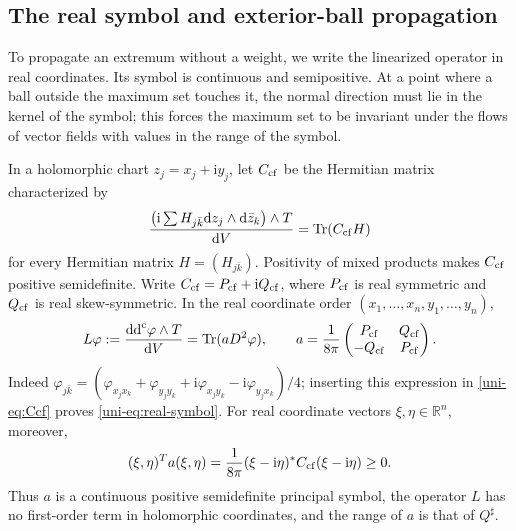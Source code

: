 \subsection{The real symbol and exterior-ball propagation}

To propagate an extremum without a weight, we write the linearized operator in real coordinates. Its symbol is continuous and semipositive. At a point where a ball outside the maximum set touches it, the normal direction must lie in the kernel of the symbol; this forces the maximum set to be invariant under the flows of vector fields with values in the range of the symbol.

In a holomorphic chart $z_j=x_j+\mathrm{i} y_j$, let $C_{\rm cf}$ be the
Hermitian matrix characterized by
\begin{equation}\label{uni-eq:Ccf}
 \frac{\bigl(\mathrm{i}\sum H_{j\bar k}\mathrm{d}z_j\wedge \mathrm{d}\bar z_k\bigr)\wedge T}{\mathrm{d}V}
     =\operatorname{Tr}(C_{\rm cf}H)
\end{equation}
for every Hermitian matrix $H=(H_{j\bar k})$.  Positivity of mixed products makes
$C_{\rm cf}$ positive semidefinite.  Write
$C_{\rm cf}=P_{\rm cf}+\mathrm{i} Q_{\rm cf}$, where $P_{\rm cf}$ is real
symmetric and $Q_{\rm cf}$ is real skew-symmetric.
In the real coordinate
order $(x_1,\ldots,x_n,y_1,\ldots,y_n)$,
\begin{equation}\label{uni-eq:real-symbol}
 L\varphi:=\frac{\mathrm{dd}^{\mathrm{c}}\varphi\wedge T}{\mathrm{d}V}
       =\operatorname{Tr}(aD^2\varphi),\qquad
 a=\frac1{8\pi}
 \begin{pmatrix}P_{\rm cf}&Q_{\rm cf}\\-Q_{\rm cf}&P_{\rm cf}\end{pmatrix}.
\end{equation}
Indeed
$\varphi_{j\bar k}=(\varphi_{x_jx_k}+\varphi_{y_jy_k}
+\mathrm{i}\varphi_{x_jy_k}-\mathrm{i}\varphi_{y_jx_k})/4$; inserting this expression
in \eqref{uni-eq:Ccf} proves \eqref{uni-eq:real-symbol}.  For real coordinate vectors $\xi,\eta\in\mathbb R^n$, moreover,
\[
 (\xi,\eta)^Ta(\xi,\eta)
    =\frac1{8\pi}(\xi-\mathrm{i}\eta)^*C_{\rm cf}(\xi-\mathrm{i}\eta)\geq0.
\]
Thus $a$ is a continuous positive semidefinite principal symbol, the operator $L$ has no first-order term in
holomorphic coordinates, and the range of $a$ is that of $Q^\sharp$.

